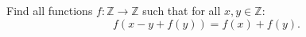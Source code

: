 Find all functions $f: \mathbb{Z}\rightarrow\mathbb{Z}$ such that for all $x,y \in \mathbb{Z}$:\[f(x-y+f(y))=f(x)+f(y).\]